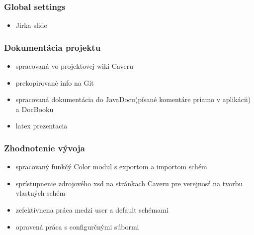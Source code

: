 \documentclass[slovak]{beamer}
\begin{document}
\begin{frame}
\frametitle{Global settings}
	\begin{itemize}
		\item Jirka slide
	\end{itemize}
\end{frame}

\begin{frame}
\frametitle{Dokumentácia projektu}
	\begin{itemize}
		\item spracovaná vo projektovej wiki Caveru
		\item prekopirované info na Git
		\item spracovaná dokumentácia do JavaDocu(písané komentáre priamo v aplikácii) a DocBooku
		\item latex prezentacia
	\end{itemize}
\end{frame}

\begin{frame}
\frametitle{Zhodnotenie vývoja}
	\begin{itemize}
		\item spracovaný funkčý Color modul s exportom a importom schém
		\item sprístupnenie zdrojového xsd na stránkach Caveru pre verejnosť na tvorbu vlastných schém
		\item zefektívnena práca medzi user a default schémami
		\item opravená práca s configurčnými súbormi
	\end{itemize}
\end{frame}
\end{document}
